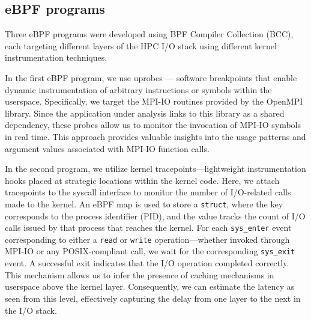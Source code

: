 \documentclass[sigconf]{acmart}
\begin{document}
\subsection{eBPF programs} 


Three eBPF programs \cite{ebpf_github} were developed using BPF Compiler Collection (BCC), each targeting different layers of the HPC I/O stack using different kernel instrumentation techniques.

In the first eBPF program, we use uprobes — software breakpoints that enable dynamic instrumentation of arbitrary instructions or symbols within the userspace. Specifically, we target the MPI-IO routines provided by the OpenMPI library. Since the application under analysis links to this library as a shared dependency, these probes allow us to monitor the invocation of MPI-IO symbols in real time. This approach provides valuable insights into the usage patterns and argument values associated with MPI-IO function calls.

In the second program, we utilize kernel tracepoints—lightweight instrumentation hooks placed at strategic locations within the kernel code. Here, we attach tracepoints to the syscall interface to monitor the number of I/O-related calls made to the kernel. An eBPF map is used to store a \texttt{struct}, where the key corresponds to the process identifier (PID), and the value tracks the count of I/O calls issued by that process that reaches the kernel. For each \texttt{sys\_enter} event corresponding to either a \texttt{read} or \texttt{write} operation—whether invoked through MPI-IO or any POSIX-compliant call, we wait for the corresponding \texttt{sys\_exit} event. A successful exit indicates that the I/O operation completed correctly. This mechanism allows us to infer the presence of caching mechanisms in userspace above the kernel layer. Consequently, we can estimate the latency as seen from this level, effectively capturing the delay from one layer to the next in the I/O stack.
\end{document}
